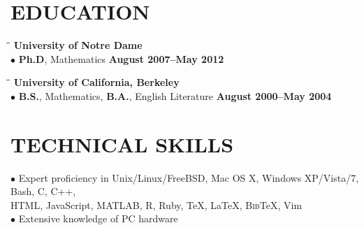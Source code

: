 \documentclass{resume}
\begin{document}
\begin{resume}
	\section{EDUCATION}  \vspace{0.05in}
	\begin{tabbing}
\hspace{2.3in}\= \hspace{2.6in}\= \kill
\textbf{University of Notre Dame} \\
$\bullet$ \textbf{Ph.D}, Mathematics \>\>\textbf{August 2007--May 2012}
\\ 
      \end{tabbing}	
	\vspace{-0.5in} 
	\begin{tabbing}
\hspace{2.3in}\= \hspace{2.6in}\= \kill
\textbf{University of California, Berkeley}
\\
$\bullet$ \textbf{B.S.}, Mathematics, \textbf{B.A.}, English Literature \>\>\textbf{August 2000--May 2004}
\end{tabbing}

\section{TECHNICAL SKILLS} \vspace{0.05in}
	$\bullet$ Expert proficiency in 
	Unix/Linux/FreeBSD, Mac OS X, Windows XP/Vista/7, Bash, C, C++, \\
	\phantom{$\bullet$} HTML, 
JavaScript, MATLAB, R, Ruby, \TeX{}, \LaTeX{}, B\textsc{ib}\TeX{}, Vim\\
	$\bullet$ Extensive knowledge of PC hardware 

\end{resume}
\end{document}
